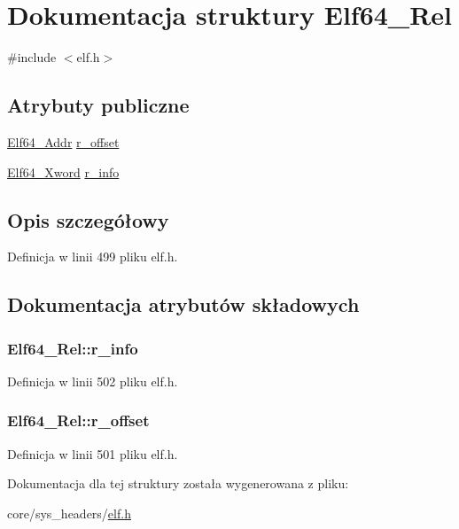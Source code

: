\hypertarget{struct_elf64___rel}{\section{Dokumentacja struktury Elf64\-\_\-\-Rel}
\label{struct_elf64___rel}
}


{\ttfamily \#include $<$elf.\-h$>$}

\subsection*{Atrybuty publiczne}
\begin{DoxyCompactItemize}
\item 
\hyperlink{elf_8h_aeed51d08e3a950d637f8ec1f0cd4ef65}{Elf64\-\_\-\-Addr} \hyperlink{struct_elf64___rel_af719169bd59569a885bf9d5df794b951}{r\-\_\-offset}
\item 
\hyperlink{elf_8h_a5447a48a3dae0bd24f606415268c6fe4}{Elf64\-\_\-\-Xword} \hyperlink{struct_elf64___rel_a775740962c9bd1e3f956bd8bffca173b}{r\-\_\-info}
\end{DoxyCompactItemize}


\subsection{Opis szczegółowy}


Definicja w linii 499 pliku elf.\-h.



\subsection{Dokumentacja atrybutów składowych}
\hypertarget{struct_elf64___rel_a775740962c9bd1e3f956bd8bffca173b}{
\subsubsection[{r\-\_\-info}]{ Elf64\-\_\-\-Rel\-::r\-\_\-info}}\label{struct_elf64___rel_a775740962c9bd1e3f956bd8bffca173b}


Definicja w linii 502 pliku elf.\-h.

\hypertarget{struct_elf64___rel_af719169bd59569a885bf9d5df794b951}{
\subsubsection[{r\-\_\-offset}]{ Elf64\-\_\-\-Rel\-::r\-\_\-offset}}\label{struct_elf64___rel_af719169bd59569a885bf9d5df794b951}


Definicja w linii 501 pliku elf.\-h.



Dokumentacja dla tej struktury została wygenerowana z pliku\-:\begin{DoxyCompactItemize}
\item 
core/sys\-\_\-headers/\hyperlink{elf_8h}{elf.\-h}\end{DoxyCompactItemize}
